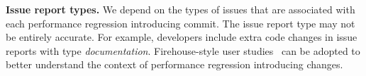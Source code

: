 \textbf{Issue report types. }We depend on the types of issues that are associated with each performance regression introducing commit. The issue report type may not be entirely accurate. For example, developers include extra code changes in issue reports with type \emph{documentation}. Firehouse-style user studies~\cite{thomasfritzfirehouse} can be adopted to better understand the context of performance regression introducing changes. 



